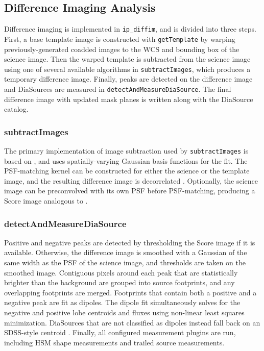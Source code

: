 \subsection{Difference Imaging Analysis}
\label{sec:dia}

Difference imaging is implemented in \texttt{ip\_diffim}, and is divided into three steps.
First, a base template image is constructed with \texttt{getTemplate} by warping previously-generated coadded images to the WCS and bounding box of the science image.
Then the warped template is subtracted from the science image using one of several available algorithms in \texttt{subtractImages}, which produces a temporary difference image.
Finally, peaks are detected on the difference image and DiaSources are measured in \texttt{detectAndMeasureDiaSource}.
The final difference image with updated mask planes is written along with the DiaSource catalog.

\subsubsection{subtractImages}

The primary implementation of image subtraction used by \texttt{subtractImages} is based on \citet{1998ApJ...503..325A}, and uses spatially-varying Gaussian basis functions for the fit.
The PSF-matching kernel can be constructed for either the science or the template image, and the resulting difference image is decorrelated \citet{DMTN-021}.
Optionally, the science image can be preconvolved with its own PSF before PSF-matching, producing a Score image analogous to \citet{2016ApJ...830...27Z}.

\subsubsection{detectAndMeasureDiaSource}
\label{sec:detectAndMeasureDiaSource}

Positive and negative peaks are detected by thresholding the Score image if it is available.
Otherwise, the difference image is smoothed with a Gaussian of the same width as the PSF of the science image, and thresholds are taken on the smoothed image.
Contiguous pixels around each peak that are statistically brighter than the background are grouped into source footprints, and any overlapping footprints are merged.
Footprints that contain both a positive and a negative peak are fit as dipoles.
The dipole fit simultaneously solves for the negative and positive lobe centroids and fluxes using non-linear least squares minimization.
DiaSources that are not classified as dipoles instead fall back on an SDSS-style centroid \citep{2003AJ....125.1559P}.
Finally, all configured measurement plugins are run, including HSM shape measurements \citep{2003MNRAS.343..459H,2005MNRAS.361.1287M} and trailed source measurements.

